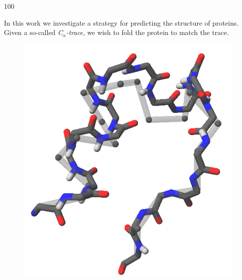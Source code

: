 \documentclass[a0,portrait]{a0poster}
\newcommand{\Ca}{C$_{\alpha}${}}
\begin{document}
\begin{GridBlock}{0}{21}{100}
\begin{multicols}{3}
\begin{multicols}{2}

\vspace*{-.7cm}
In this work we investigate a strategy for predicting the structure of proteins. Given a so-called \emph{\Ca-trace}, we wish to fold the protein to match the trace.
\newpage
\begin{figure}
\vspace{2cm}
\hspace{-3cm}
\includegraphics[width=\columnwidth]{../rapport/figures/forside.png}
\vspace{-1.5cm}
\end{figure}
\end{multicols}
\vspace{-.5cm}




\end{multicols}
\end{GridBlock}
\end{document}
